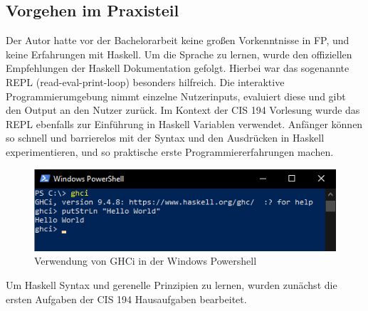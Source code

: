\subsection{Vorgehen im Praxisteil}
Der Autor hatte vor der Bachelorarbeit keine großen Vorkenntnisse in FP, und keine Erfahrungen mit Haskell. Um die Sprache zu lernen, wurde den offiziellen Empfehlungen der Haskell Dokumentation gefolgt. Hierbei war das sogenannte REPL (read-eval-print-loop) besonders hilfreich. Die interaktive Programmierumgebung nimmt einzelne Nutzerinputs, evaluiert diese und gibt den Output an den Nutzer zurück. Im Kontext der CIS 194 Vorlesung wurde das REPL ebenfalls zur Einführung in Haskell Variablen verwendet.
Anfänger können so schnell und barrierelos mit der Syntax und den Ausdrücken in Haskell experimentieren, und so praktische erste Programmiererfahrungen machen.

\begin{figure}[H]
    \centering
    \includegraphics[width=1\linewidth]{Figures/Anhang/ghci}
    \caption{Verwendung von GHCi in der Windows Powershell}
\end{figure}

Um Haskell Syntax und gerenelle Prinzipien zu lernen, wurden zunächst die ersten Aufgaben der CIS 194 Hausaufgaben bearbeitet.